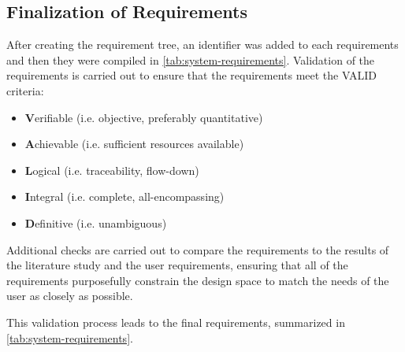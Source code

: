 \subsection{Finalization of Requirements}
After creating the requirement tree, an identifier was added to each requirements and then they were compiled in \autoref{tab:system-requirements}.
Validation of the requirements is carried out to ensure that the requirements meet the VALID criteria:
\begin{itemize}
    \item \textbf{V}erifiable (i.e. objective, preferably quantitative)
    \item \textbf{A}chievable (i.e. sufficient resources available)
    \item \textbf{L}ogical (i.e. traceability, flow-down)
    \item \textbf{I}ntegral (i.e. complete, all-encompassing)
    \item \textbf{D}efinitive (i.e. unambiguous)
\end{itemize}

Additional checks are carried out to compare the requirements to the results of the literature study and the user requirements, ensuring that all of the requirements purposefully constrain the design space to match the needs of the user as closely as possible. 

This validation process leads to the final requirements, summarized in \autoref{tab:system-requirements}.
\vspace{-10pt}
\bgroup
\renewcommand{\arraystretch}{1.1}

